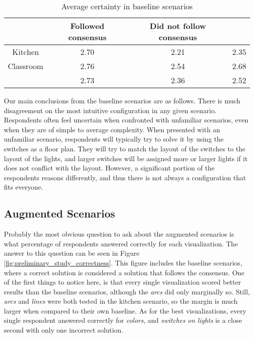 \begin{table}
    \centering
    \begin{tabular}{|c|c c|c|} 
    \hline
              & Followed consensus & Did not follow consensus &      \\
    \hline
    Kitchen   &               2.70 &                     2.21 & 2.35 \\
    Classroom &               2.76 &                     2.54 & 2.68 \\
    \hline
              &               2.73 &                     2.36 & 2.52 \\
    \hline
\end{tabular}
\caption{Average certainty in baseline scenarios}
\label{table:preliminary_study_baseline_certainties}
\end{table}

Our main conclusions from the baseline scenarios are as follows. There is much disagreement on the most intuitive configuration in any given scenario. Respondents often feel uncertain when confronted with unfamiliar scenarios, even when they are of simple to average complexity. When presented with an unfamiliar scenario, respondents will typically try to solve it by using the switches as a floor plan. They will try to match the layout of the switches to the layout of the lights, and larger switches will be assigned more or larger lights if it does not conflict with the layout. However, a significant portion of the respondents reasons differently, and thus there is not always a configuration that fits everyone.

\subsection{Augmented Scenarios} \label{sec:preliminary_study:augmented_scenarios}

Probably the most obvious question to ask about the augmented scenarios is what percentage of respondents answered correctly for each visualization. The answer to this question can be seen in Figure \ref{fig:preliminary_study_correctness}. This figure includes the baseline scenarios, where a correct solution is considered a solution that follows the consensus. One of the first things to notice here, is that every single visualization scored better results than the baseline scenarios, although the \textit{arcs} did only marginally so. Still, \textit{arcs} and \textit{lines} were both tested in the kitchen scenario, so the margin is much larger when compared to their own baseline. As for the best visualizations, every single respondent answered correctly for \textit{colors}, and \textit{switches on lights} is a close second with only one incorrect solution.

